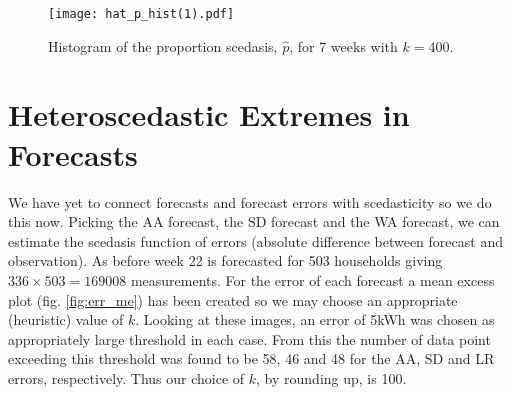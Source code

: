 \begin{figure}
\centering
\texttt{[image: hat\_p\_hist(1).pdf]}%
\caption{\label{fig:hh_sced_prop} Histogram of the proportion scedasis, $\hat{p}$, for 7 weeks with $k=400$.}
\end{figure}

\section{Heteroscedastic Extremes in Forecasts} \label{subsec:sced_forecast}

We have yet to connect forecasts and forecast errors with scedasticity so we do this now. Picking the AA forecast, the SD forecast and the WA forecast, we can estimate the scedasis function of errors (absolute difference between forecast and observation). As before week 22 is forecasted for 503 households giving $336 \times 503 = 169008$ measurements. For the error of each forecast a mean excess plot (fig. \ref{fig:err_me}) has been created so we may choose an appropriate (heuristic) value of $k$. Looking at these images, an error of 5kWh was chosen as appropriately large threshold in each case. From this the number of data point exceeding this threshold was found to be 58, 46 and 48 for the AA, SD and LR errors, respectively. Thus our choice of $k$, by rounding up, is 100. %

%
%

